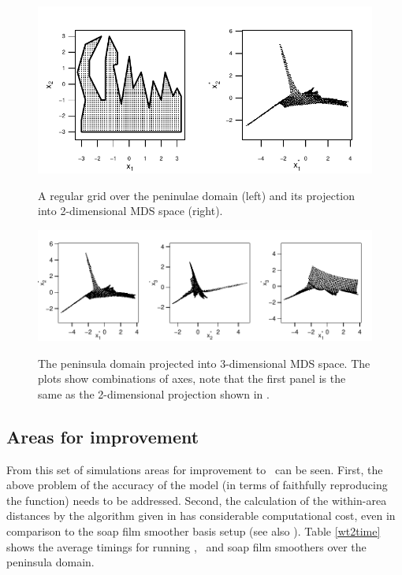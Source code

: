 \begin{figure}
\centering
\includegraphics[width=6in]{mds/figs/wt2-2d-proj.pdf} \\
\caption{A regular grid over the peninulae domain (left) and its projection into 2-dimensional MDS space (right).}
\label{wt2-2d-proj}
\end{figure}

\begin{figure}
\includegraphics[width=9in]{mds/figs/wt2-3d-proj.pdf} \\
\caption{The peninsula domain projected into 3-dimensional MDS space. The plots show combinations of axes, note that the first panel is the same as the 2-dimensional projection shown in .\label{cor-r38}}
\label{wt2-3d-proj}
\end{figure}

\subsection{Areas for improvement}

From this set of simulations areas for improvement to \mdsap\ can be seen. First, the above problem of the accuracy of the model (in terms of faithfully reproducing the function) needs to be addressed. Second, the calculation of the within-area distances by the algorithm given in  has considerable computational cost, even in comparison to the soap film smoother basis setup (see also ). Table \ref{wt2time} shows the average timings for running \mdsap, \tprs\ and soap film smoothers over the peninsula domain.

